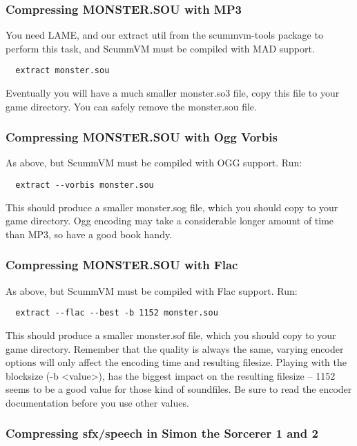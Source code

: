 \subsubsection{Compressing MONSTER.SOU with MP3}

You need LAME, and our extract util from the scummvm-tools package to perform
this task, and ScummVM must be compiled with MAD support.
\begin{verbatim}
  extract monster.sou
\end{verbatim}
%
Eventually you will have a much smaller monster.so3 file, copy this file
to your game directory. You can safely remove the monster.sou file.


\subsubsection{Compressing MONSTER.SOU with Ogg Vorbis}

As above, but ScummVM must be compiled with OGG support. Run:
\begin{verbatim}
  extract --vorbis monster.sou
\end{verbatim}
%
This should produce a smaller monster.sog file, which you should copy to your
game directory. Ogg encoding may take a considerable longer amount of time
than MP3, so have a good book handy.


\subsubsection{Compressing MONSTER.SOU with Flac}

As above, but ScummVM must be compiled with Flac support. Run:
\begin{verbatim}
  extract --flac --best -b 1152 monster.sou
\end{verbatim}
%
This should produce a smaller monster.sof file, which you should copy to your
game directory. Remember that the quality is always the same, varying encoder
options will only affect the encoding time and resulting  filesize. Playing
with the blocksize (-b <value>), has the biggest impact on the resulting
filesize -- 1152 seems to be a good value for those kind of soundfiles. Be sure
to read the encoder documentation before you use other values.


\subsubsection{Compressing sfx/speech in Simon the Sorcerer 1 and 2}

